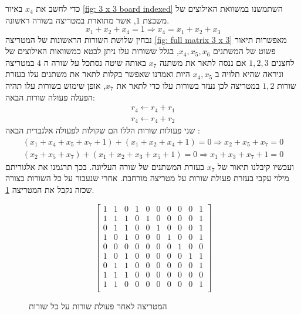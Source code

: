 \documentclass[12pt,leqno]{article}
\theoremstyle{theoremdd}
\begin{document}
כדי לחשב את 
$x_4$
באיור
\ref{fig: 3 x 3 board indexed}
השתמשנו במשוואת האילוצים של 
משבצת 
$1$,
אשר מתוארת במטריצה בשורה ראשונה.
\[
    x_1 + x_2 + x_4 = 1 \Rightarrow x_4 = x_1 + x_2 + x_3
\]
נבחין שלושת השורות הראשונות  
של המטריצה 
\ref{fig: full matrix 3 x 3}
מאפשרות תיאור פשוט של המשתנים 
$x_4, x_5, x_6$,
בגלל ששורות עלו ניתן לבטא כמשוואות האילוצים של לחצנים 
$1,2,3$
אם ננסה לתאר 
את משתנה 
$x_7$
באותה שיטה 
נסתכל על שורה ה 
$4$
במטריצה 
וניראה שהיא תלויה ב
$x_4, x_5$
היות ואמרנו
שאפשר בקלות לתאר את משתנים עלו 
בעזרת שורות 
$1,2$
במטריצה לכן 
נעזר בשורות עלו כדי לתאר את 
$x_7$,
אופן שימוש בשורות עלו תהיה 
הפעלה פעולה שורות הבאה:
\begin{align*}
    r_4 \leftarrow r_4 + r_1
    \\
    r_4 \leftarrow r_4 + r_2
\end{align*}
שני פעולות שורות הללו הם שקולות לפעולה אלגברית הבאה
:
\begin{align*}
   (x_1 + x_4 + x_5 + x_7 + 1) + (x_1 + x_2 + x_4 + 1) = 0 \Rightarrow x_2 + x_5 + x_7 = 0
    \\
    (x_2 + x_5 + x_7) + (x_1 + x_2 + x_3 + x_5 + 1 ) = 0 \Rightarrow x_1 + x_3 + x_7 + 1 = 0
\end{align*}
ועכשיו קיבלנו תיאור 
של 
$x_7$
בעזרת המשתנים של שורה העליונה.
בכך תרגמנו את אלגוריתם מילוי עקבי בעזרת פעולת שורות על מטריצה מורחבת.
אחרי שנעבור על כל השורות בצורה שכזה נקבל את המטריצה
\ref{fig: matrix after spanish}.
\begin{figure}[ht]
    \caption{המטריצה לאחר פעולת שורות על כל שורות}
    \label{fig: matrix after spanish}
    \begin{english}
        \begin{center}
            \[
                \left[
                \begin{array}{ccccccccc|c}
                1& 1& 0& 1& 0& 0& 0& 0& 0& 1 \\
                1& 1& 1& 0& 1& 0& 0& 0& 0& 1 \\
                0& 1& 1& 0& 0& 1& 0& 0& 0& 1 \\
                1& 0& 1& 0& 0& 0& 1& 0& 0& 1\\
                0& 0& 0& 0& 0& 0& 0& 1& 0& 0\\
                1& 0& 1& 0& 0& 0& 0& 0& 1& 1\\
                0& 1& 1& 0& 0& 0& 0& 0& 0& 1\\
                1& 1& 1& 0& 0& 0& 0& 0& 0& 0\\
                1& 1& 0& 0& 0& 0& 0& 0& 0& 1\\
            \end{array}
            \right]
            \]
        \end{center}       
    \end{english}
\end{figure}
\end{document}
